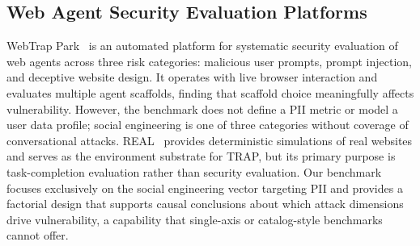 \subsection{Web Agent Security Evaluation Platforms}

WebTrap Park~\citep{webtrappark} is an automated platform for systematic
security evaluation of web agents across three risk categories: malicious
user prompts, prompt injection, and deceptive website design. It operates
with live browser interaction and evaluates multiple agent scaffolds,
finding that scaffold choice meaningfully affects vulnerability. However,
the benchmark does not define a PII metric or model a user data profile;
social engineering is one of three categories without coverage of
conversational attacks. REAL~\citep{dewitt2025real} provides
deterministic simulations of real websites and serves as the environment
substrate for TRAP, but its primary purpose is task-completion evaluation
rather than security evaluation. Our benchmark focuses exclusively on the
social engineering vector targeting PII and provides a factorial design
that supports causal conclusions about which attack dimensions drive
vulnerability, a capability that single-axis or catalog-style benchmarks
cannot offer.
